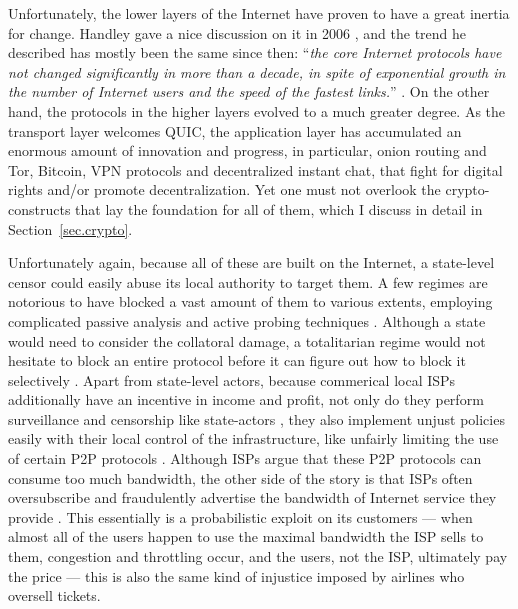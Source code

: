 \documentclass[10pt]{article}
\begin{document}
Unfortunately, the lower layers of the Internet have proven to have a great
inertia for change.  Handley gave a nice discussion on it in 2006
\cite{why.internet.just.works}, and the trend he described has mostly been the
same since then: ``\emph{the core Internet protocols have not changed
significantly in more than a decade, in spite of exponential growth in the
number of Internet users and the speed of the fastest links.}''
\cite{why.internet.just.works}. On the other hand, the protocols in the higher
layers evolved to a much greater degree. As the transport layer welcomes
QUIC\cite{quic}, the application layer has accumulated an enormous amount of
innovation and progress, in particular, onion routing and
Tor\cite{onion.routing, tor}, Bitcoin\cite{bitcoin}, VPN
protocols\cite{openvpn, wireguard} and decentralized instant chat\cite{matrix,
tox}, that fight for digital rights and/or promote decentralization. Yet one
must not overlook the crypto-constructs that lay the foundation for all of
them, which I discuss in detail in Section~\ref{sec.crypto}.

Unfortunately again, because all of these are built on the Internet, a
state-level censor could easily abuse its local authority to target them. A few
regimes are notorious to have blocked a vast amount of them to various
extents, employing complicated passive analysis and active probing techniques
\cite{censor.block.1, censor.block.2,censor.block.3, censor.block.4,
censor.block.5,censor.block.6}.
Although a state would need to consider the collatoral damage, a totalitarian
regime would not hesitate to block an entire protocol before it can figure out
how to block it selectively \cite{selective.block.1, censor.block.4}. 
Apart from state-level actors, because commerical local ISPs additionally
have an incentive in income and profit, not only do they perform surveillance
and censorship like state-actors \cite{isp.statelike.actions.1,
isp.statelike.actions.2}, they also implement unjust policies easily with their
local control of the infrastructure, like unfairly limiting the use of certain
P2P protocols \cite{isp.block.p2p.1, isp.block.p2p.2, isp.block.p2p.3,
isp.statelike.actions.1}.  Although ISPs argue that these P2P protocols can
consume too much bandwidth, the other side of the story is that ISPs often
oversubscribe and fraudulently advertise the bandwidth of Internet service they
provide \cite{isp.oversubscribe.1, isp.oversubscribe.2}. This essentially is a
probabilistic exploit on its customers --- when almost all of the users happen
to use the maximal bandwidth the ISP sells to them, congestion and throttling
occur, and the users, not the ISP, ultimately pay the price --- this is also
the same kind of injustice imposed by airlines who oversell tickets.
\end{document}
